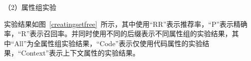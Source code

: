 
（2）属性组实验

实验结果如图~\ref{creatingsetfree}~所示，其中使用“RR”表示推荐率，“P”表示精确率，“R”表示召回率。并同时使用不同的后缀表示不同属性组的实验结果，其中“All”为全属性组实验结果，“Code”表示仅使用代码属性的实验结果，“Context”表示上下文属性的实验结果。

